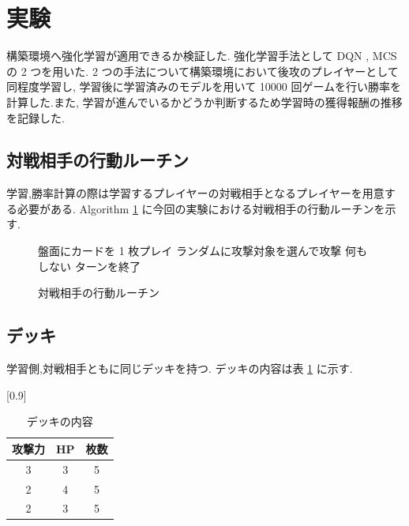 \documentclass[twocolumn]{jarticle}     %
\begin{document}
\section{実験}
構築環境へ強化学習が適用できるか検証した.
強化学習手法として DQN , MCS の 2 つを用いた. 2 つの手法について構築環境において後攻のプレイヤーとして同程度学習し, 学習後に学習済みのモデルを用いて 10000 回ゲームを行い勝率を計算した.また, 学習が進んでいるかどうか判断するため学習時の獲得報酬の推移を記録した.

\subsection{対戦相手の行動ルーチン}

学習,勝率計算の際は学習するプレイヤーの対戦相手となるプレイヤーを用意する必要がある.
Algorithm \ref{alg1} に今回の実験における対戦相手の行動ルーチンを示す.
\begin{figure}[H]
  \begin{algorithm}[H]
      \caption{
        対戦相手の行動ルーチン
        }
      \label{alg1}
      \begin{algorithmic}[1] 
      \STATE 盤面にカードを 1 枚プレイ
      \STATE ランダムに攻撃対象を選んで攻撃
      \ELSE
      \STATE 何もしない
      \ENDIF
      \ENDFOR
      \STATE ターンを終了
      \end{algorithmic}
  \end{algorithm}
  \end{figure}


\subsection{デッキ}
学習側,対戦相手ともに同じデッキを持つ.
デッキの内容は表 \ref{table:deck} に示す.
\begin{table}[H]
  \centering
  \caption{デッキの内容}
  \label{table:deck}
  \vspace{-0.3cm}
  \scalebox{0.9}[0.9]{
    \begin{tabular}{|c|c|c|}
      \hline
      攻撃力 &  HP  & 枚数 \\ \hline \hline
      3 & 3 & 5  \\ \hline
      2 & 4 & 5  \\ \hline
      2 & 3 & 5  \\ \hline
      \end{tabular}
  }
  \end{table}
\end{document}
